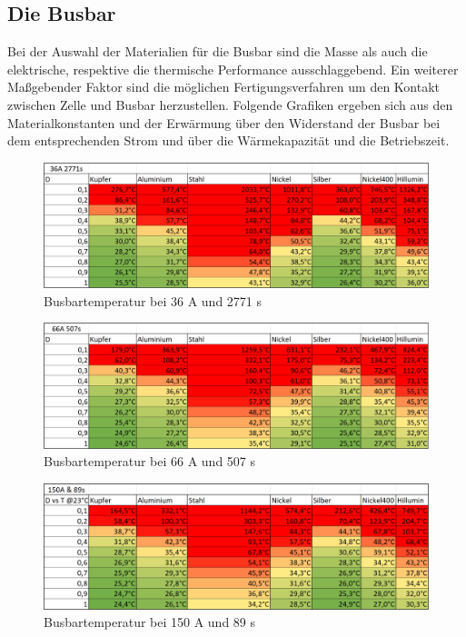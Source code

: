 \FloatBarrier
\subsection{Die Busbar}
 Bei der Auswahl der Materialien für die Busbar sind die Masse als auch die elektrische, respektive die thermische Performance ausschlaggebend. Ein weiterer Maßgebender Faktor sind die möglichen Fertigungsverfahren um den Kontakt zwischen Zelle und Busbar herzustellen. Folgende Grafiken ergeben sich aus den Materialkonstanten und der Erwärmung über den Widerstand der Busbar bei dem entsprechenden Strom und über die Wärmekapazität und die Betriebszeit.
 
 \begin{figure}[]
 	\centering
 	\includegraphics[width=0.7\linewidth]{bilder/Busbar_temp_36A_2771s}
 	\caption{Busbartemperatur bei 36 A und 2771 s}
 	\label{fig:Busbar_temp_36A_2771s}
 \end{figure}
\begin{figure}[]
	\centering
	\includegraphics[width=0.7\linewidth]{bilder/Busbar_temp_66A_507s}
	\caption{Busbartemperatur bei 66 A und 507 s}
	\label{fig:Busbar_temp_66A_507s}
\end{figure}
\begin{figure}[]
	\centering
	\includegraphics[width=0.7\linewidth]{bilder/Busbar_temp_150A_89s}
	\caption{Busbartemperatur bei 150 A und 89 s}
	\label{fig:Busbar_temp_150A_89s}
\end{figure}

